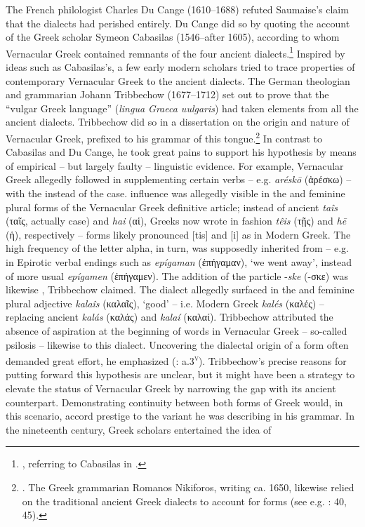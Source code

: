 \largerpage[1.75]
The French philologist Charles Du Cange (1610–1688) refuted Saumaise’s claim that the dialects had perished entirely. Du Cange did so by quoting the account of the Greek scholar Symeon Cabasilas (1546–after 1605), according to whom Vernacular Greek contained remnants of the four ancient dialects.\footnote{ \citet[viii]{Du1688}, referring to Cabasilas in \citet[462]{Crusius1584}.} Inspired by ideas such as Cabasilas’s, a few early modern scholars tried to trace properties of contemporary Vernacular Greek to the ancient dialects. The German theologian and grammarian Johann Tribbechow (1677–1712) set out to prove that the “vulgar Greek language” (\textit{lingua Graeca uulgaris}) had taken elements from all the ancient dialects. Tribbechow did so in a dissertation on the origin and nature of Vernacular Greek, prefixed to his grammar of this tongue.\footnote{\citet[a.3\textsc{\textsuperscript{r}}]{Tribbechow1705}. The Greek grammarian Romanos Nikiforos, writing ca. 1650, likewise relied on the traditional ancient Greek dialects to account for  forms (see e.g. \citealt{Nikiforos1908}: 40, 45).} In contrast to Cabasilas and Du Cange, he took great pains to support his hypothesis by means of empirical – but largely faulty – linguistic evidence. For example, Vernacular Greek allegedly followed  in supplementing certain verbs – e.g. \textit{aréskō} (ἀρέσκω) – with the  instead of the  case.  influence was allegedly visible in the  and  feminine plural forms of the Vernacular Greek definitive article; instead of ancient \textit{taîs} (ταῖς, actually  case) and \textit{hai} (αἱ), Greeks now wrote in  fashion \textit{têis} (τῇς) and \textit{hē} (ἡ), respectively – forms likely pronounced [tis] and [i] as in Modern Greek. The high frequency of the letter alpha, in turn, was supposedly inherited from  – e.g. in  Epirotic verbal endings such as \textit{epígaman} (ἐπήγαμαν), ‘we went away’, instead of more usual \textit{epígamen} (ἐπήγαμεν). The addition of the particle -\textit{ske} (-σκε) was likewise , Tribbechow claimed. The  dialect allegedly surfaced in the  and  feminine plural adjective \textit{kalaîs} (καλαῖς), ‘good’ – i.e. Modern Greek \textit{kalés} (καλές) – replacing ancient \textit{kalás} (καλάς) and \textit{kalaí} (καλαί). Tribbechow attributed the absence of aspiration at the beginning of words in Vernacular Greek – so-called psilosis – likewise to this dialect. Uncovering the dialectal origin of a  form often demanded great effort, he emphasized (\citealt{Tribbechow1705}: a.3\textsc{\textsuperscript{v}}). Tribbechow’s precise reasons for putting forward this hypothesis are unclear, but it might have been a strategy to elevate the status of Vernacular Greek by narrowing the gap with its ancient counterpart. Demonstrating continuity between both forms of Greek would, in this scenario, accord prestige to the  variant he was describing in his grammar. In the nineteenth century, Greek scholars entertained the idea of 